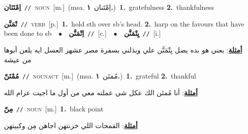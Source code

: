 \documentclass[10pt,a4paper,twoside]{article} %
\begin{document}
\begin{multicols}{2}
{\setlength\topsep{0pt}\textbf{\foreignlanguage{arabic}{اِمْتَنَان}}\ {\color{gray}\texttt{//}\color{black}}\ \textsc{noun}\ [m.]\ \color{gray}(msa. \foreignlanguage{arabic}{اِمْتَنان}~\foreignlanguage{arabic}{\textbf{١.}})\color{black}\ \textbf{1.}~gratefulness  \textbf{2.}~thankfulness\ } \vspace{2mm}

{\setlength\topsep{0pt}\textbf{\foreignlanguage{arabic}{تْمَنَّن}}\ {\color{gray}\texttt{//}\color{black}}\ \textsc{verb}\ [p.]\ \textbf{1.}~hold sth over sb's head.  \textbf{2.}~harp on the favours that have been done to sb\ \ $\bullet$\ \ \setlength\topsep{0pt}\textbf{\foreignlanguage{arabic}{اِتْمَنَّن}}\ {\color{gray}\texttt{//}\color{black}}\ [c.]\ \ $\bullet$\ \ \setlength\topsep{0pt}\textbf{\foreignlanguage{arabic}{يِتْمَنَّن}}\ {\color{gray}\texttt{//}\color{black}}\ [i.]\  \begin{flushright}\color{gray}\foreignlanguage{arabic}{\textbf{\underline{\foreignlanguage{arabic}{أمثلة}}}: يعني هو بده يضل يِتْمَنَّن علي ويذلني بسفرة مصر عشهر العسل ايه يلعن أبوها من عيشة}\end{flushright}\color{black}} \vspace{2mm}

{\setlength\topsep{0pt}\textbf{\foreignlanguage{arabic}{مُمْتَنّ}}\ {\color{gray}\texttt{//}\color{black}}\ \textsc{noun\textunderscore act}\ [m.]\ \color{gray}(msa. \foreignlanguage{arabic}{مُمتَن}~\foreignlanguage{arabic}{\textbf{١.}})\color{black}\ \textbf{1.}~grateful  \textbf{2.}~thankful\  \begin{flushright}\color{gray}\foreignlanguage{arabic}{\textbf{\underline{\foreignlanguage{arabic}{أمثلة}}}: أنا مُمتَن الك عكل شي عملته معي من أول ما اجيت عرام الله}\end{flushright}\color{black}} \vspace{2mm}

{\setlength\topsep{0pt}\textbf{\foreignlanguage{arabic}{مِنّ}}\ {\color{gray}\texttt{//}\color{black}}\ \textsc{noun}\ [m.]\ \textbf{1.}~black point\  \begin{flushright}\color{gray}\foreignlanguage{arabic}{\textbf{\underline{\foreignlanguage{arabic}{أمثلة}}}: القمحات اللي خزنتهن اجاهن مِن وكبيتهن}\end{flushright}\color{black}} \vspace{2mm}


\end{multicols}
\end{document}
